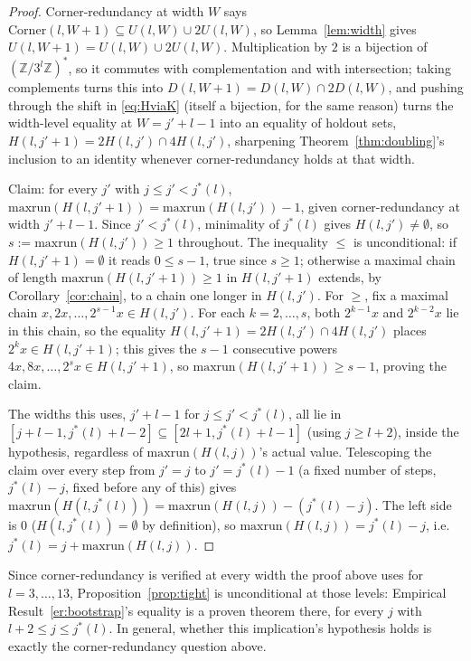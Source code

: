 \documentclass[11pt]{amsart}
\theoremstyle{plain}
\theoremstyle{definition}
\theoremstyle{remark}
\newcommand{\Z}{\mathbb{Z}}
\begin{document}
\begin{proof}
Corner-redundancy at width $W$ says $\mathrm{Corner}(l,W+1)\subseteq U(l,W)\cup2U(l,W)$, so
Lemma~\ref{lem:width} gives $U(l,W+1)=U(l,W)\cup2U(l,W)$. Multiplication by $2$ is a bijection of
$(\Z/3^l\Z)^*$, so it commutes with complementation and with intersection; taking complements turns
this into $D(l,W+1)=D(l,W)\cap2D(l,W)$, and pushing through the shift in \eqref{eq:HviaK} (itself a
bijection, for the same reason) turns the width-level equality at $W=j'+l-1$ into an equality of
holdout sets, $H(l,j'+1)=2H(l,j')\cap4H(l,j')$, sharpening Theorem~\ref{thm:doubling}'s inclusion to
an identity whenever corner-redundancy holds at that width.

Claim: for every $j'$ with $j\le j'<j^*(l)$, $\mathrm{maxrun}(H(l,j'+1))=\mathrm{maxrun}(H(l,j'))-1$,
given corner-redundancy at width $j'+l-1$. Since $j'<j^*(l)$, minimality of $j^*(l)$ gives
$H(l,j')\ne\emptyset$, so $s:=\mathrm{maxrun}(H(l,j'))\ge1$ throughout. The inequality $\le$ is
unconditional: if $H(l,j'+1)=\emptyset$ it reads $0\le s-1$, true since $s\ge1$; otherwise a maximal
chain of length $\mathrm{maxrun}(H(l,j'+1))\ge1$ in $H(l,j'+1)$ extends, by Corollary~\ref{cor:chain},
to a chain one longer in $H(l,j')$. For $\ge$, fix a maximal chain $x,2x,\dots,2^{s-1}x\in H(l,j')$.
For each $k=2,\dots,s$, both $2^{k-1}x$ and $2^{k-2}x$ lie in this chain, so the equality
$H(l,j'+1)=2H(l,j')\cap4H(l,j')$ places $2^kx\in H(l,j'+1)$; this gives the $s-1$ consecutive powers
$4x,8x,\dots,2^sx\in H(l,j'+1)$, so $\mathrm{maxrun}(H(l,j'+1))\ge s-1$, proving the claim.

The widths this uses, $j'+l-1$ for $j\le j'<j^*(l)$, all lie in $[j+l-1,j^*(l)+l-2]\subseteq[2l+1,
j^*(l)+l-1]$ (using $j\ge l+2$), inside the hypothesis, regardless of $\mathrm{maxrun}(H(l,j))$'s
actual value. Telescoping the claim over every step from $j'=j$ to $j'=j^*(l)-1$ (a fixed number of
steps, $j^*(l)-j$, fixed before any of this) gives
$\mathrm{maxrun}(H(l,j^*(l)))=\mathrm{maxrun}(H(l,j))-(j^*(l)-j)$. The left side is $0$
($H(l,j^*(l))=\emptyset$ by definition), so $\mathrm{maxrun}(H(l,j))=j^*(l)-j$, i.e.\
$j^*(l)=j+\mathrm{maxrun}(H(l,j))$.
\end{proof}

Since corner-redundancy is verified at every width the proof above uses for $l=3,\dots,13$,
Proposition~\ref{prop:tight} is unconditional at those levels: Empirical Result~\ref{er:bootstrap}'s
equality is a proven theorem there, for every $j$ with $l+2\le j\le j^*(l)$. In general, whether this
implication's hypothesis holds is exactly the corner-redundancy question above.
\end{document}
